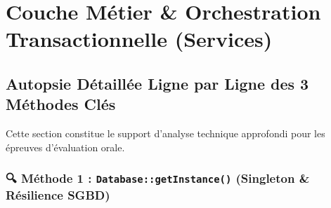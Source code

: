 \documentclass[11pt,a4paper,titlepage,twoside,openright]{report}
\begin{document}
\chapter{Couche Métier \& Orchestration Transactionnelle (Services)}

\section{Autopsie Détaillée Ligne par Ligne des 3 Méthodes Clés}

Cette section constitue le support d'analyse technique approfondi pour les épreuves d'évaluation orale.

\subsection{🔍 Méthode 1 : \texttt{Database::getInstance()} (Singleton \& Résilience SGBD)}
\end{document}
